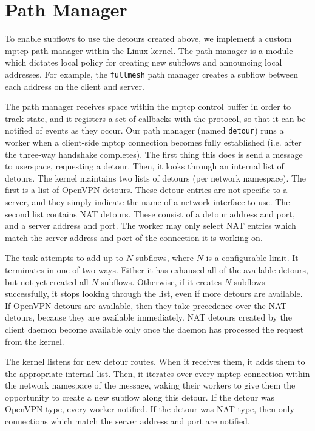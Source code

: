 \documentclass{cwru}
\begin{document}
\section{Path Manager}

To enable subflows to use the detours created above, we implement a custom \ac{mptcp}
path manager within the Linux kernel. The path manager is a module which
dictates local policy for creating new subflows and announcing local addresses.
For example, the \texttt{fullmesh} path manager creates a subflow between each
address on the client and server.

The path manager receives space within the \ac{mptcp} control buffer in order to
track state, and it registers a set of callbacks with the protocol, so that it
can be notified of events as they occur. Our path manager (named
\texttt{detour}) runs a worker when a client-side \ac{mptcp} connection becomes
fully established (i.e. after the three-way handshake completes). The first
thing this does is send a message to userspace, requesting a detour. Then, it
looks through an internal list of detours. The kernel maintains two lists of
detours (per network namespace). The first is a list of OpenVPN detours. These
detour entries are not specific to a server, and they simply indicate the name
of a network interface to use. The second list contains NAT detours. These
consist of a detour address and port, and a server address and port. The worker
may only select NAT entries which match the server address and port of the
connection it is working on.

The task attempts to add up to $N$ subflows, where $N$ is a configurable limit.
It terminates in one of two ways. Either it has exhaused all of the available
detours, but not yet created all $N$ subflows. Otherwise, if it creates $N$
subflows successfully, it stops looking through the list, even if more detours
are available. If OpenVPN detours are available, then they take precedence over
the NAT detours, because they are available immediately. NAT detours created by
the client daemon become available only once the daemon has processed the
request from the kernel.

The kernel listens for new detour routes. When it receives them, it adds them to
the appropriate internal list. Then, it iterates over every \ac{mptcp} connection
within the network namespace of the message, waking their workers to give them
the opportunity to create a new subflow along this detour. If the detour was
OpenVPN type, every worker notified. If the detour was NAT type, then only
connections which match the server address and port are notified.
\end{document}
